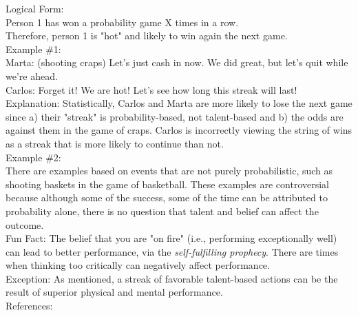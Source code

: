 \documentclass[a4paper,12pt,single,pdftex]{scrbook}
\begin{document}
    
      Logical Form:
    \\

    
      Person 1 has won a probability game X times in a row.
    \\

    
      Therefore, person 1 is "hot" and likely to win again the next game.
    \\

    
      Example \#1:
    \\

    
      Marta: (shooting craps) Let's just cash in now. We did great, but let's quit while we're ahead.
    \\

    
      Carlos: Forget it! We are hot! Let's see how long this streak will last!
    \\

    
      Explanation: Statistically, Carlos and Marta are more likely to lose the next game since a) their "streak" is probability-based, not talent-based and b) the odds are against them in the game of craps. Carlos is incorrectly viewing the string of wins as a streak that is more likely to continue than not.
    \\

    
      Example \#2:
    \\

    
      There are examples based on events that are not purely probabilistic, such as shooting baskets in the game of basketball. These examples are controversial because although some of the success, some of the time can be attributed to probability alone, there is no question that talent and belief can affect the outcome.
    \\

    
      Fun Fact: The belief that you are "on fire" (i.e., performing exceptionally well) can lead to better performance, via the {\it self-fulfilling prophecy}. There are times when thinking too critically can negatively affect performance.
    \\

    
      Exception: As mentioned, a streak of favorable talent-based actions can be the result of superior physical and mental performance. 
    \\

    References:

    
      
        
      \\
\end{document}
